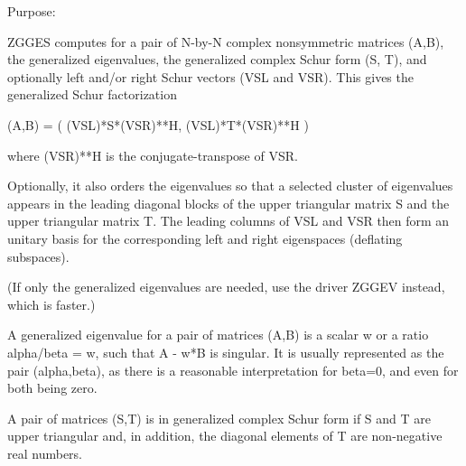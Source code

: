 \begin{DoxyParagraph}{Purpose\+: }
\begin{DoxyVerb} ZGGES computes for a pair of N-by-N complex nonsymmetric matrices
 (A,B), the generalized eigenvalues, the generalized complex Schur
 form (S, T), and optionally left and/or right Schur vectors (VSL
 and VSR). This gives the generalized Schur factorization

         (A,B) = ( (VSL)*S*(VSR)**H, (VSL)*T*(VSR)**H )

 where (VSR)**H is the conjugate-transpose of VSR.

 Optionally, it also orders the eigenvalues so that a selected cluster
 of eigenvalues appears in the leading diagonal blocks of the upper
 triangular matrix S and the upper triangular matrix T. The leading
 columns of VSL and VSR then form an unitary basis for the
 corresponding left and right eigenspaces (deflating subspaces).

 (If only the generalized eigenvalues are needed, use the driver
 ZGGEV instead, which is faster.)

 A generalized eigenvalue for a pair of matrices (A,B) is a scalar w
 or a ratio alpha/beta = w, such that  A - w*B is singular.  It is
 usually represented as the pair (alpha,beta), as there is a
 reasonable interpretation for beta=0, and even for both being zero.

 A pair of matrices (S,T) is in generalized complex Schur form if S
 and T are upper triangular and, in addition, the diagonal elements
 of T are non-negative real numbers.\end{DoxyVerb}
 
\end{DoxyParagraph}

